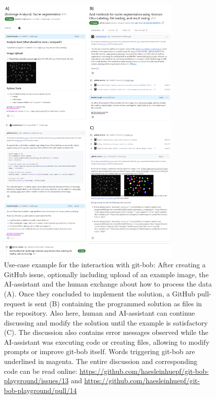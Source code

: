 \documentclass[times, twoside]{zHenriquesLab-StyleBioRxiv}
\begin{document}
\begin{figure}[h]
\centering
\includegraphics[width=0.8\textwidth]{example_interaction.png}
\caption{Use-case example for the interaction with git-bob: After creating a GitHub issue, optionally including upload of an example image, the AI-assistant and the human exchange about how to process the data (A). Once they concluded to implement the solution, a GitHub pull-request is sent (B) containing the programmed solution as files in the repository. Also here, human and AI-assistant can continue discussing and modify the solution until the example is satisfactory (C). The discussion also contains error messages observed while the AI-assistant was executing code or creating files, allowing to modify prompts or improve git-bob itself. Words triggering git-bob are underlined in magenta. The entire discussion and corresponding code can be read online: \url{https://github.com/haesleinhuepf/git-bob-playground/issues/13} and \url{https://github.com/haesleinhuepf/git-bob-playground/pull/14}
\newline
\newline
}
\label{fig:example_interaction}
\end{figure}
\end{document}

